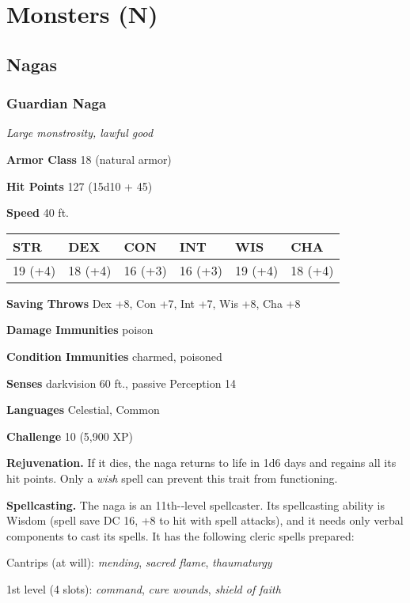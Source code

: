 \documentclass[
]{article}
\date{}
\begin{document}
\hypertarget{monsters-n}{%
\section{Monsters (N)}\label{monsters-n}}

\hypertarget{nagas}{%
\subsection{Nagas}\label{nagas}}

\hypertarget{guardian-naga}{%
\subsubsection{Guardian Naga}\label{guardian-naga}}

\emph{Large monstrosity, lawful good}

\textbf{Armor Class} 18 (natural armor)

\textbf{Hit Points} 127 (15d10 + 45)

\textbf{Speed} 40 ft.

\begin{longtable}[]{@{}llllll@{}}
\toprule
STR & DEX & CON & INT & WIS & CHA\tabularnewline
\midrule
\endhead
19 (+4) & 18 (+4) & 16 (+3) & 16 (+3) & 19 (+4) & 18 (+4)\tabularnewline
\bottomrule
\end{longtable}

\textbf{Saving Throws} Dex +8, Con +7, Int +7, Wis +8, Cha +8

\textbf{Damage Immunities} poison

\textbf{Condition Immunities} charmed, poisoned

\textbf{Senses} darkvision 60 ft., passive Perception 14

\textbf{Languages} Celestial, Common

\textbf{Challenge} 10 (5,900 XP)

\textbf{Rejuvenation.} If it dies, the naga returns to life in 1d6 days
and regains all its hit points. Only a \emph{wish} spell can prevent
this trait from functioning.

\textbf{Spellcasting.} The naga is an 11th-­‐level spellcaster. Its
spellcasting ability is Wisdom (spell save DC 16, +8 to hit with spell
attacks), and it needs only verbal components to cast its spells. It has
the following cleric spells prepared:

Cantrips (at will): \emph{mending}, \emph{sacred flame},
\emph{thaumaturgy}

1st level (4 slots): \emph{command}, \emph{cure wounds}, \emph{shield of
faith}
\end{document}
